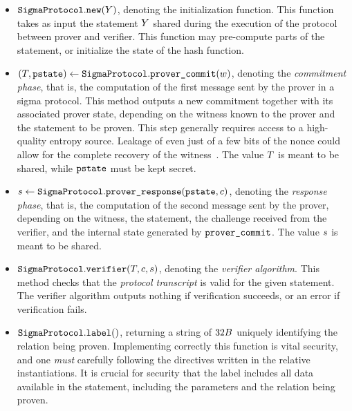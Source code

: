 \documentclass[11pt]{article}
\begin{document}
      \begin{itemize}
        \item $\texttt{SigmaProtocol}.\texttt{new}(Y)$,
        denoting the initialization function. This function takes as input the statement $Y$ shared during the execution of the protocol between prover and verifier.
        This function may pre-compute parts of the statement, or initialize the state of the hash function.
        \item
          $(T, \texttt{pstate})\gets \texttt{SigmaProtocol}.\texttt{prover\_commit}(w)$,
          denoting the \emph{commitment phase}, that is, the computation of the first message sent by the prover in a sigma protocol. This method outputs a new commitment together with its associated prover state, depending on the witness known to the prover and the statement to be proven.
          This step generally requires access to a high-quality entropy source.
          Leakage of even just of a few bits of the nonce could allow for the complete recovery of the witness~\cite{lattice-attack,bleichenbacher,CCS:ANTTY20}.
					The value $T$ is meant to be shared, while $\texttt{pstate}$ must be kept secret.
        \item
          $s \gets \texttt{SigmaProtocol}.\texttt{prover\_response}(\texttt{pstate}, c)$,
          denoting the \emph{response phase}, that is, the computation of the second message sent by the prover, depending on the witness, the statement, the challenge received from the verifier, and the internal state generated by $\texttt{prover\_commit}$.
          The value $s$ is meant to be shared.
        \item $\texttt{SigmaProtocol}.\texttt{verifier}(T, c, s)$,
          denoting the \emph{verifier algorithm}. This method checks that
          the \emph{protocol transcript} is valid for the given statement.
          The verifier algorithm outputs nothing if verification succeeds,
          or an error if verification fails.
          \item $\texttt{SigmaProtocol}.\texttt{label}()$,
          returning a string of $32B$ uniquely identifying the relation being proven.
          Implementing correctly this function is vital security, and one \emph{must} carefully following the directives written in the relative instantiations. It is crucial for security that the label includes all data available in the statement, including the parameters and the relation being proven.


\end{itemize}
\end{document}
